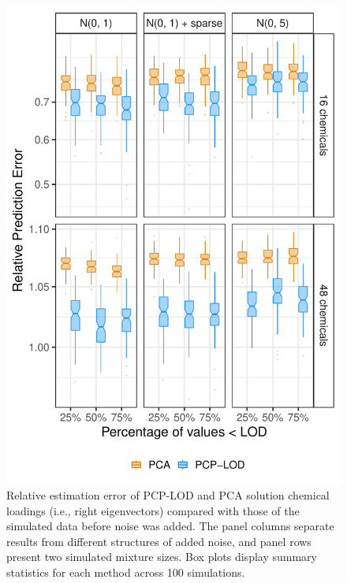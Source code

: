 {\begin{figure}
    \centering
\includegraphics[width=.75\textwidth]{figures/svd_boxplots_right.pdf}
   \caption{Relative estimation error of PCP-LOD and PCA solution chemical loadings (i.e., right eigenvectors) compared with those of the simulated data before noise was added. The panel columns separate results from different structures of added noise, and panel rows present two simulated mixture sizes. Box plots display summary statistics for each method across 100 simulations.}
    \label{fig:svd_right}
\end{figure}
} %

\clearpage